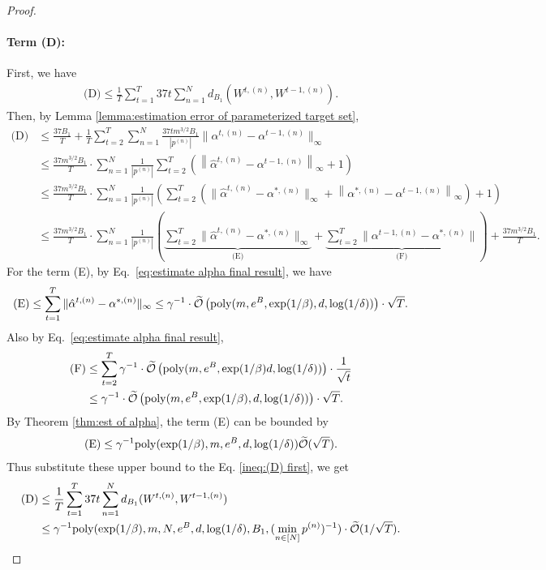 \begin{proof}
 \paragraph{Term (D):} 
First, we have 
\begin{align*}
    \textrm{(D)}\le \frac{1}{T}\sum_{t=1}^T 37t \sum_{n=1}^N d_{B_1}(W^{t,(n)}, W^{t-1,(n)}).
\end{align*}
Then, by Lemma \ref{lemma:estimation error of parameterized target set}, 
 \begin{align}
     \textrm{(D)}&\le \frac{37B_1}{T} + \frac{1}{T}\sum_{t=2}^T\sum_{n=1}^N  \frac{37tm^{3/2}B_1}{|p^{(n)}|}\|\alpha^{t,(n)} - \alpha^{t-1,(n)}\|_\infty\nonumber\\
     &\le \frac{37m^{3/2}B_1}{T}\cdot \sum_{n=1}^N \frac{1}{|p^{(n)}|}\sum_{t=2}^T \left(\left\|\hat{\alpha}^{t,(n)}-\alpha^{t-1,(n)}\right\|_\infty + 1\right)\nonumber\\
     &\le \frac{37m^{3/2}B_1}{T}\cdot \sum_{n=1}^N \frac{1}{|p^{(n)}|}\left(\sum_{t=2}^T \left(\| \hat{\alpha}^{t,(n)}-\alpha^{*,(n)}\|_\infty + \left\|\alpha^{*,(n)}-\alpha^{t-1,(n)}\right\|_\infty\right) + 1\right)\nonumber\\
     &\le \frac{37m^{3/2}B_1}{T} \cdot \sum_{n=1}^N \frac{1}{|p^{(n)}|}\left(\underbrace{\sum_{t=2}^T \|\hat{\alpha}^{t,(n)} - \alpha^{*,(n)}\|_\infty}_{\textrm{(E)}} + \underbrace{\sum_{t=2}^T \|\alpha^{t-1,(n)}-\alpha^{*,(n)}\| }_{\textrm{(F)}}\right) + \frac{37m^{3/2}B_1}{T}.\label{ineq:(D) first}
 \end{align}
 For the term (E), by Eq.~\eqref{eq:estimate alpha final result}, we have 
 \begin{align*}
     \mathrm{(E)}\le \sum_{t=1}^T \|\hat{\alpha}^{t,(n)}-\alpha^{*,(n)}\|_\infty\le \gamma^{-1}\cdot \widetilde{\mathcal{O}}\left(\mathrm{poly}(m,e^B, \exp(1/\beta), d,\log(1/\delta))\right)\cdot \sqrt{T}.
 \end{align*}
 Also by Eq.~\eqref{eq:estimate alpha final result}, 
 \begin{align*}
     \textrm{(F)}&\le \sum_{t=2}^T \gamma^{-1}\cdot \widetilde{\mathcal{O}}\left(\mathrm{poly}(m,e^B,\exp(1/\beta) d,\log(1/\delta))\right)\cdot \frac{1}{\sqrt{t}}\\
     &\le \gamma^{-1}\cdot \widetilde{\mathcal{O}}\left(\mathrm{poly}(m,e^B, \exp(1/\beta), d,\log(1/\delta))\right)\cdot \sqrt{T}.
 \end{align*}
 By Theorem \ref{thm:est of alpha}, the term (E) can be bounded by 
 \begin{align*}
     \textrm{(E)}\le \gamma^{-1}\mathrm{poly}(\exp(1/\beta), m, e^B, d, \log(1/\delta))\widetilde{\mathcal{O}}(\sqrt{T}).
 \end{align*}
 Thus substitute these upper bound to the Eq. \eqref{ineq:(D) first}, we get
 \begin{align}
     \textrm{(D)}&\le \frac{1}{T}\sum_{t=1}^T 37t \sum_{n=1}^N d_{B_1}(W^{t,(n)}, W^{t-1,(n)})\nonumber\\&\le \gamma^{-1}\mathrm{poly}(\exp(1/\beta), m, N, e^B, d, \log(1/\delta), B_1, (\min_{n \in [N]}p^{(n)})^{-1})\cdot\widetilde{\mathcal{O}}(1/\sqrt{T}).\label{ineq:(D)final}
 \end{align}


\end{proof}
